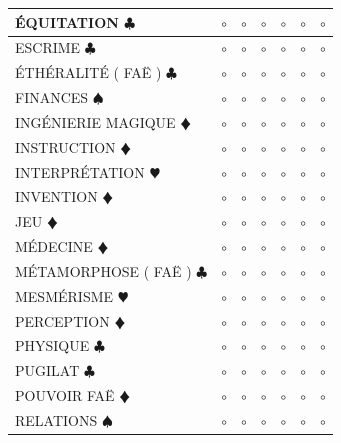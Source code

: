 \documentclass[a5paper,french]{article}
\begin{document}
\begin{tabular}[c]{|p{}|p{}|p{}|p{}|p{}|p{}|p{}|}
	ÉQUITATION { $\clubsuit$ }							&	$\circ$	&	$\circ$	&	$\circ$	&	$\circ$	&	$\circ$		&	$\circ$		\\ \hline
	ESCRIME { $\clubsuit$ }								&	$\circ$	&	$\circ$	&	$\circ$	&	$\circ$	&	$\circ$		&	$\circ$		\\ \hline
	ÉTHÉRALITÉ ( FAË ) { $\clubsuit$ }					&	$\circ$	&	$\circ$	&	$\circ$	&	$\circ$	&	$\circ$		&	$\circ$		\\ \hline
	FINANCES { $\spadesuit$ }							&	$\circ$	&	$\circ$	&	$\circ$	&	$\circ$	&	$\circ$		&	$\circ$		\\ \hline
	INGÉNIERIE MAGIQUE {\color{red} $\vardiamond$ }		&	$\circ$	&	$\circ$	&	$\circ$	&	$\circ$	&	$\circ$		&	$\circ$		\\ \hline
	INSTRUCTION {\color{red} $\vardiamond$ }			&	$\circ$	&	$\circ$	&	$\circ$	&	$\circ$	&	$\circ$		&	$\circ$		\\ \hline
	INTERPRÉTATION {\color{red} $\varheart$ }			&	$\circ$	&	$\circ$	&	$\circ$	&	$\circ$	&	$\circ$		&	$\circ$		\\ \hline
	INVENTION {\color{red} $\vardiamond$ }				&	$\circ$	&	$\circ$	&	$\circ$	&	$\circ$	&	$\circ$		&	$\circ$		\\ \hline
	JEU {\color{red} $\vardiamond$ }					&	$\circ$	&	$\circ$	&	$\circ$	&	$\circ$	&	$\circ$		&	$\circ$		\\ \hline
	MÉDECINE {\color{red} $\vardiamond$ }				&	$\circ$	&	$\circ$	&	$\circ$	&	$\circ$	&	$\circ$		&	$\circ$		\\ \hline
	MÉTAMORPHOSE ( FAË ) { $\clubsuit$ }				&	$\circ$	&	$\circ$	&	$\circ$	&	$\circ$	&	$\circ$		&	$\circ$		\\ \hline
	MESMÉRISME {\color{red} $\varheart$ }				&	$\circ$	&	$\circ$	&	$\circ$	&	$\circ$	&	$\circ$		&	$\circ$		\\ \hline
	PERCEPTION {\color{red} $\vardiamond$ }				&	$\circ$	&	$\circ$	&	$\circ$	&	$\circ$	&	$\circ$		&	$\circ$		\\ \hline
	PHYSIQUE { $\clubsuit$ }							&	$\circ$	&	$\circ$	&	$\circ$	&	$\circ$	&	$\circ$		&	$\circ$		\\ \hline
	PUGILAT { $\clubsuit$ }								&	$\circ$	&	$\circ$	&	$\circ$	&	$\circ$	&	$\circ$		&	$\circ$		\\ \hline
	POUVOIR FAË {\color{red} $\vardiamond$ }			&	$\circ$	&	$\circ$	&	$\circ$	&	$\circ$	&	$\circ$		&	$\circ$		\\ \hline
	RELATIONS { $\spadesuit$ }							&	$\circ$	&	$\circ$	&	$\circ$	&	$\circ$	&	$\circ$		&	$\circ$		\\ \hline

\end{tabular}
\end{document}
